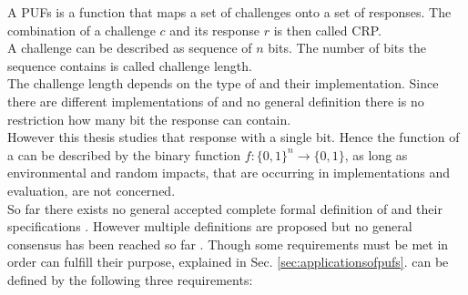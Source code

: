 A \acfp{PUF} is a function that maps a set of challenges onto a set of responses.
The combination of a challenge $c$ and its response $r$ is then called \ac{CRP}.\\
A challenge can be described as sequence of $n$ bits.
The number of bits the sequence contains is called challenge length.\\
The challenge length depends on the type of \puf and their implementation.
Since there are different implementations of \pufs and no general definition there is no restriction how many bit the response can contain.\\
However this thesis studies \pufs that response with a single bit.
Hence the function of a \puf can be described by the binary function $f: \{0, 1\}^n \to \{0,1\}$, as long as environmental and random impacts, that are occurring in \puf implementations and evaluation, are not concerned.\\
So far there exists no general accepted complete formal definition of \pufs and their specifications \cite{Becker2015ThePUFs}.
However multiple definitions are proposed but no general consensus has been reached so far \cite{Armknecht2011AFunctions,Ruhrmair2014PUFsGlance,Tehranipoor2012IntroductionTrust}.
Though some requirements must be met in order \pufs can fulfill their purpose, explained in Sec. \ref{sec:applicationsofpufs}.
\pufs can be defined by the following three requirements:


